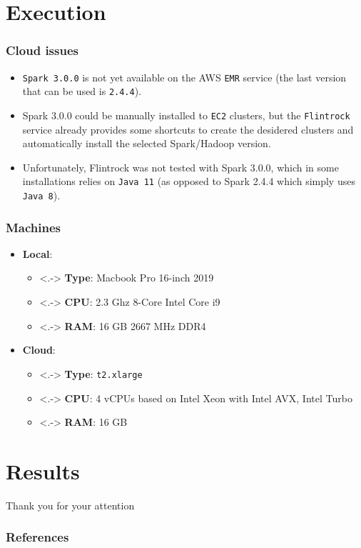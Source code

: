 \documentclass{beamer}
\begin{document}
\section{Execution}
\begin{frame}
  \frametitle{Cloud issues}
  \begin{itemize}[<+->]
    \item \texttt{Spark 3.0.0} is not yet available on the AWS \texttt{EMR} service (the last version that can be used is \texttt{2.4.4}).
    \item Spark 3.0.0 could be manually installed to \texttt{EC2} clusters, but the \texttt{Flintrock} service already provides some shortcuts to create the desidered clusters and automatically install the selected Spark/Hadoop version.
    \item Unfortunately, Flintrock was not tested with Spark 3.0.0, which in some installations relies on \texttt{Java 11} (as opposed to Spark 2.4.4 which simply uses \texttt{Java 8}).
  \end{itemize}
\end{frame}

\begin{frame}
  \frametitle{Machines}
  \begin{itemize}[<+->]
    \item \textbf{Local}:
    \begin{itemize}
      \item<.-> \textbf{Type}: Macbook Pro 16-inch 2019
      \item<.-> \textbf{CPU}: 2.3 Ghz 8-Core Intel Core i9
      \item<.-> \textbf{RAM}: 16 GB 2667 MHz DDR4
    \end{itemize}
    \item \textbf{Cloud}: 
      \begin{itemize}
        \item<.-> \textbf{Type}: \texttt{t2.xlarge}
        \item<.-> \textbf{CPU}: 4 vCPUs based on Intel Xeon with Intel AVX, Intel Turbo
        \item<.-> \textbf{RAM}: 16 GB
    \end{itemize}
  \end{itemize}
\end{frame}

\section{Results}


\appendix

\begin{frame}[standout]
	Thank you for your attention
\end{frame}

\begin{frame}
	\frametitle{References}
	\nocite{*}
    
    
\end{frame}
\end{document}

